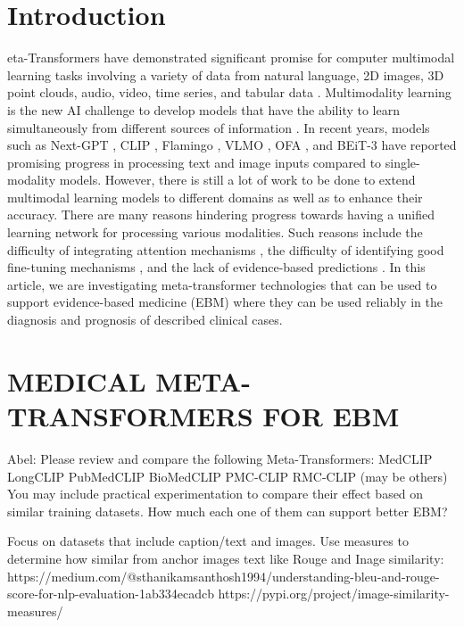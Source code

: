 \section{Introduction} 
eta-Transformers have demonstrated significant promise for computer multimodal learning tasks involving a variety of data from natural language, 2D images, 3D point clouds, audio, video, time series, and tabular data \cite{zhang2023meta}. Multimodality learning is the new AI challenge to develop models that have the ability to learn simultaneously from different sources of information \cite{munikoti2024generalist}. In recent years, models such as Next-GPT \cite{wu2023next}, CLIP \cite{radford2021learning}, Flamingo \cite{alayrac2022flamingo}, VLMO \cite{wang2021vlmo}, OFA \cite{wang2022unifying}, and BEiT-3 \cite{wang2022image} have reported promising progress in processing text and image inputs compared to single-modality models. However, there is still a lot of work to be done to extend multimodal learning models to different domains as well as to enhance their accuracy. There are many reasons hindering progress towards having a unified learning network for processing various modalities. Such reasons include the difficulty of integrating attention mechanisms \cite{lee2024metaswin}, the difficulty of identifying good fine-tuning mechanisms \cite{li2023fine}, and the lack of evidence-based predictions \cite{kline2022multimodal}. In this article, we are investigating meta-transformer technologies that can be used to support evidence-based medicine (EBM) where they can be used reliably in the diagnosis and prognosis of described clinical cases.



\section{MEDICAL META-TRANSFORMERS FOR EBM}

Abel: Please review and compare the following Meta-Transformers:
MedCLIP
LongCLIP
PubMedCLIP
BioMedCLIP
PMC-CLIP
RMC-CLIP
(may be others)
You may include practical experimentation to compare their effect based on similar training datasets. How much each one of them can support better EBM?

Focus on datasets that include caption/text and images. Use measures to determine how similar from anchor images text like Rouge and Inage similarity:
https://medium.com/@sthanikamsanthosh1994/understanding-bleu-and-rouge-score-for-nlp-evaluation-1ab334ecadcb
https://pypi.org/project/image-similarity-measures/

